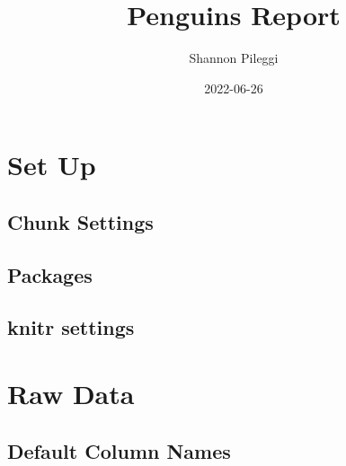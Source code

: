 \documentclass[
  landscape]{article}
\title{Penguins Report}
\author{Shannon Pileggi}
\date{2022-06-26}
\begin{document}
\maketitle

\newpage{}

{
\setcounter{tocdepth}{2}
\tableofcontents
}
\let\oldsection\section
\renewcommand\section{\clearpage\oldsection}

\hypertarget{set-up}{%
\section{Set Up}\label{set-up}}

\hypertarget{chunk-settings}{%
\subsection{Chunk Settings}\label{chunk-settings}}

\hypertarget{packages}{%
\subsection{Packages}\label{packages}}

\hypertarget{knitr-settings}{%
\subsection{knitr settings}\label{knitr-settings}}

\hypertarget{raw-data}{%
\section{Raw Data}\label{raw-data}}

\hypertarget{default-column-names}{%
\subsection{Default Column Names}\label{default-column-names}}
\end{document}
